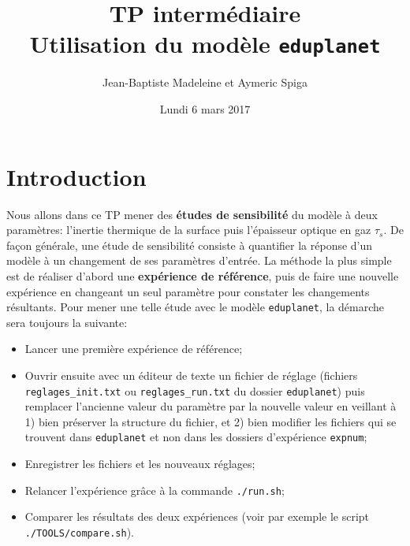 \documentclass[a4paper,12pt]{article}
\begin{document}

\title{\textbf{TP intermédiaire}\\
Utilisation du modèle \texttt{eduplanet}}
\author{\normalsize{Jean-Baptiste Madeleine et Aymeric Spiga}}
\date{Lundi 6 mars 2017}

\maketitle

\renewcommand{\labelitemi}{\textbullet}

\section{Introduction}

Nous allons dans ce TP mener des \textbf{études de sensibilité} du modèle à
deux paramètres: l'inertie thermique de la surface puis l'épaisseur optique en
gaz $\tau_s$. De façon générale, une étude de sensibilité consiste à quantifier
la réponse d'un modèle à un changement de ses paramètres d'entrée. La méthode
la plus simple est de réaliser d'abord une \textbf{expérience de référence},
puis de faire une nouvelle expérience en changeant un seul paramètre pour
constater les changements résultants. Pour mener une telle étude avec le modèle
\texttt{eduplanet}, la démarche sera toujours la suivante:

\begin{itemize}
\item Lancer une première expérience de référence;
\item Ouvrir ensuite avec un éditeur de texte un fichier de réglage (fichiers
\texttt{reglages\_init.txt} ou \texttt{regla\-ges\_run.txt} du dossier \texttt
{eduplanet}) puis remplacer l'ancienne valeur du paramètre par la nouvelle
valeur en veillant à 1) bien préserver la structure du fichier, et 2) bien
modifier les fichiers qui se trouvent dans \texttt{eduplanet} et non dans les
dossiers d'expérience \texttt{expnum};
\item Enregistrer les fichiers et les nouveaux réglages;
\item Relancer l'expérience grâce à la commande \texttt{./run.sh};
\item Comparer les résultats des deux expériences (voir par exemple le script
\texttt{./TOOLS/compare.sh}).
\end{itemize}
\end{document}

